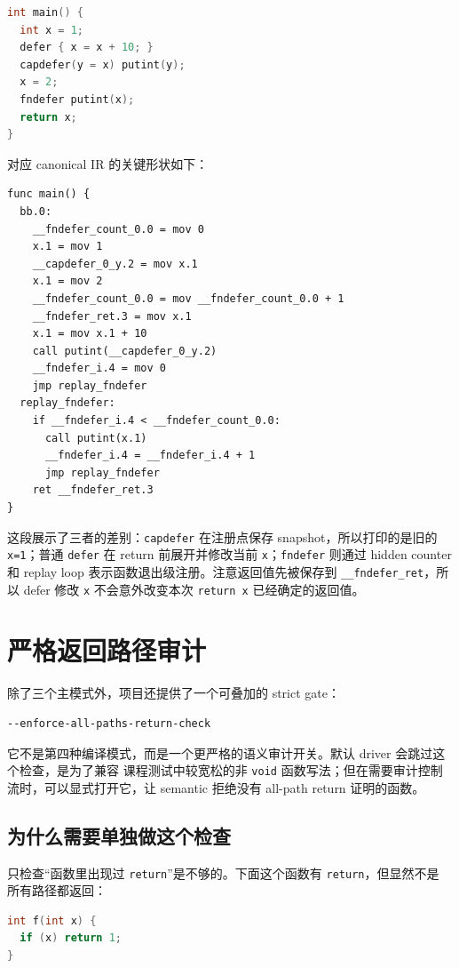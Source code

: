 \documentclass[UTF8,a4paper,11pt]{ctexart}
\begin{document}
\begin{lstlisting}[language=C]
int main() {
  int x = 1;
  defer { x = x + 10; }
  capdefer(y = x) putint(y);
  x = 2;
  fndefer putint(x);
  return x;
}
\end{lstlisting}

对应 canonical IR 的关键形状如下：

\begin{lstlisting}[language={}]
func main() {
  bb.0:
    __fndefer_count_0.0 = mov 0
    x.1 = mov 1
    __capdefer_0_y.2 = mov x.1
    x.1 = mov 2
    __fndefer_count_0.0 = mov __fndefer_count_0.0 + 1
    __fndefer_ret.3 = mov x.1
    x.1 = mov x.1 + 10
    call putint(__capdefer_0_y.2)
    __fndefer_i.4 = mov 0
    jmp replay_fndefer
  replay_fndefer:
    if __fndefer_i.4 < __fndefer_count_0.0:
      call putint(x.1)
      __fndefer_i.4 = __fndefer_i.4 + 1
      jmp replay_fndefer
    ret __fndefer_ret.3
}
\end{lstlisting}

这段展示了三者的差别：\texttt{capdefer} 在注册点保存 snapshot，所以打印的是旧的
\texttt{x=1}；普通 \texttt{defer} 在 return 前展开并修改当前 \texttt{x}；\texttt{fndefer}
则通过 hidden counter 和 replay loop 表示函数退出级注册。注意返回值先被保存到
\texttt{\_\_fndefer\_ret}，所以 defer 修改 \texttt{x} 不会意外改变本次 \texttt{return x}
已经确定的返回值。

\section{严格返回路径审计}

除了三个主模式外，项目还提供了一个可叠加的 strict gate：

\begin{lstlisting}[language={}]
--enforce-all-paths-return-check
\end{lstlisting}

它不是第四种编译模式，而是一个更严格的语义审计开关。默认 driver 会跳过这个检查，是为了兼容
课程测试中较宽松的非 \texttt{void} 函数写法；但在需要审计控制流时，可以显式打开它，让
semantic 拒绝没有 all-path return 证明的函数。

\subsection{为什么需要单独做这个检查}

只检查“函数里出现过 \texttt{return}”是不够的。下面这个函数有 \texttt{return}，但显然不是
所有路径都返回：

\begin{lstlisting}[language=C]
int f(int x) {
  if (x) return 1;
}
\end{lstlisting}
\end{document}
